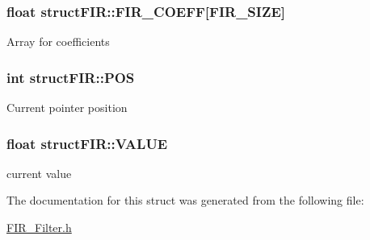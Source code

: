 \subsubsection[{\texorpdfstring{F\+I\+R\+\_\+\+C\+O\+E\+FF}{FIR_COEFF}}]{\setlength{\rightskip}{0pt plus 5cm}float struct\+F\+I\+R\+::\+F\+I\+R\+\_\+\+C\+O\+E\+FF\mbox{[}{\bf F\+I\+R\+\_\+\+S\+I\+ZE}\mbox{]}}\hypertarget{structstruct_f_i_r_a930c70fc9a12392e35058698cfeea2bd}{}\label{structstruct_f_i_r_a930c70fc9a12392e35058698cfeea2bd}
Array for coefficients 
\subsubsection[{\texorpdfstring{P\+OS}{POS}}]{\setlength{\rightskip}{0pt plus 5cm}int struct\+F\+I\+R\+::\+P\+OS}\hypertarget{structstruct_f_i_r_a1ec2eb19d75618bb41d6ac0644628a00}{}\label{structstruct_f_i_r_a1ec2eb19d75618bb41d6ac0644628a00}
Current pointer position 
\subsubsection[{\texorpdfstring{V\+A\+L\+UE}{VALUE}}]{\setlength{\rightskip}{0pt plus 5cm}float struct\+F\+I\+R\+::\+V\+A\+L\+UE}\hypertarget{structstruct_f_i_r_adde9a344645a4e3316dc0db7674427c2}{}\label{structstruct_f_i_r_adde9a344645a4e3316dc0db7674427c2}
current value 

The documentation for this struct was generated from the following file\+:\begin{DoxyCompactItemize}
\item 
\hyperlink{_f_i_r___filter_8h}{F\+I\+R\+\_\+\+Filter.\+h}\end{DoxyCompactItemize}

